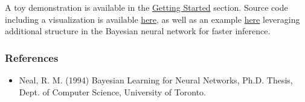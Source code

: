 A toy demonstration is available in the \href{getting-started.html}{Getting Started} section.
Source code including a visualization is available
\href{https://github.com/blei-lab/edward/blob/master/examples/bayesian_nn.py}
{here}, as well as an example
\href{https://github.com/blei-lab/edward/blob/master/examples/bayesian_nn_analytic_kl.py}
{here}
leveraging additional structure in the
Bayesian neural network for faster inference.

\subsubsection{References}\label{references}

\begin{itemize}
\item
  Neal, R. M. (1994) Bayesian Learning for Neural Networks, Ph.D.
  Thesis, Dept. of Computer Science, University of Toronto.
\end{itemize}
